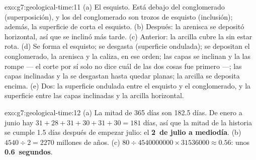 \begin{solution}{exo:g7:geological-time:11}
(a) El esquisto. Está debajo del conglomerado (superposición), y los
 del conglomerado son trozos de esquisto (inclusión); además, la
superficie de  corta el esquisto. (b) Después: la arenisca se
depositó horizontal, así que se inclinó más tarde. (c) Anterior: la arcilla
cubre la  sin estar rota. (d) Se forma el esquisto; se desgasta
(superficie ondulada); se depositan el conglomerado, la arenisca y la
caliza, en ese orden; las capas se inclinan y la  las rompe --- el
corte por sí solo no dice cuál de las dos cosas fue primero ---; las capas
inclinadas y la  se desgastan hasta quedar planas; la arcilla se
deposita encima. (e) Dos: la superficie ondulada entre el esquisto y el
conglomerado, y la superficie entre las capas inclinadas y la arcilla
horizontal.
\end{solution}

\begin{solution}{exo:g7:geological-time:12}
(a) La mitad de 365 días son 182.5 días. De enero a junio hay
$31+28+31+30+31+30 = 181$ días, así que la mitad de la historia se cumple
1.5 días después de empezar julio: el \textbf{2~de julio a mediodía}.
(b) $4540 \div 2 = 2270$ millones de años. (c)
$80 \div \num{4540000000} \times \num{31536000} \approx 0.56$: unos
\textbf{0.6~segundos}.
\end{solution}

